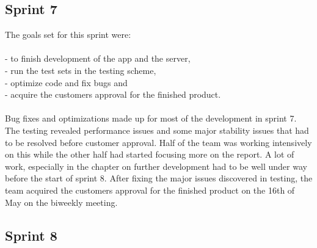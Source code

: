 \subsection{Sprint 7}
The goals set for this sprint were:\\\\
- to finish development of the app and the server,\\
- run the test sets in the testing scheme,\\
- optimize code and fix bugs and\\
- acquire the customers approval for the finished product.\\\\
Bug fixes and optimizations made up for most of the development in sprint 7. The testing revealed performance issues and some major stability issues that had to be resolved before customer approval. Half of the team was working intensively on this while the other half had started focusing more on the report. A lot of work, especially in the chapter on further development had to be well under way before the start of sprint 8. After fixing the major issues discovered in testing, the team acquired the customers approval for the finished product on the 16th of May on the biweekly meeting.

\subsection{Sprint 8}
